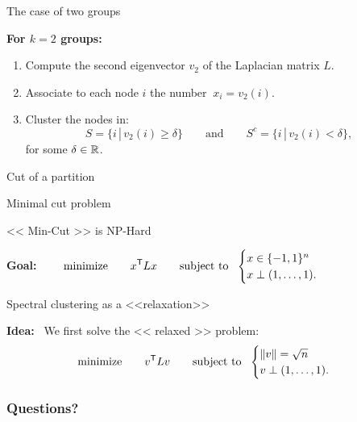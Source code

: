 \documentclass{beamer}
\begin{document}
\begin{frame}[t]{The case of two groups}
	\grid

	\textbf{For $k=2$ groups:}
	\begin{enumerate}
		\item Compute the second eigenvector $v_2$ of the Laplacian matrix $L$.
			\vspace{0.1cm}
		\item Associate to each node $i$ the number $\ x_i = v_{2}(i)$.
			\vspace{0.1cm}
		\item Cluster the nodes in:
			$$
			S = \{ i \, | \, v_2(i) \geq \delta \} \qquad \text{and} \qquad
			S^c = \{ i \, | \, v_2(i) < \delta \},
			$$
			for some $\delta \in \mathbb{R}$.
	\end{enumerate}

\end{frame}

\begin{frame}[t]{Cut of a partition}
	\grid

\end{frame}
\begin{frame}[t]{Minimal cut problem}
	\grid

\end{frame}

\begin{frame}[t]{<< Min-Cut >> is NP-Hard}
	\grid
	\vspace{-0.8cm}
	\begin{exampleblock}{}
		\textbf{Goal:}
		$\displaystyle \qquad \text{minimize}
		\qquad
		x^{{\sf T}} L x 
		\qquad
		\text{subject to}
		\ \
		\begin{cases}
			x \in \{-1,1\}^n \\
			x \perp (1, \dots, 1).
		\end{cases}
		$
	\end{exampleblock}

\end{frame}

\begin{frame}[t]{Spectral clustering as a <<relaxation>>}
	\grid

	\vspace{-0.8cm}
	\begin{exampleblock}{}
		\textbf{Idea:} \ We first solve the << relaxed >> problem:
		\vspace{-0.2cm}
		$$
		\text{minimize}
		\qquad
		v^{\sT} L v 
		\qquad
		\text{subject to}
		\ \
		\begin{cases}
			\|v\| = \sqrt{n} \\
			v \perp (1, \dots, 1).
		\end{cases}
		\vspace{-0.4cm}
		$$
	\end{exampleblock}

\end{frame}

\appendix
\backupbegin
\begin{frame}[t]
	\frametitle{Questions?}
	\grid

	\pause
\end{frame}
\backupend
\end{document}

